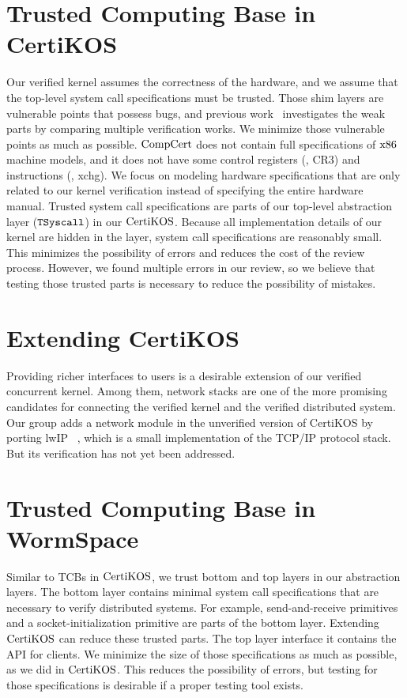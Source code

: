 \section{Trusted Computing Base in CertiKOS}

Our verified kernel assumes the correctness of the hardware, and we assume that the top-level system call specifications must be trusted. 
Those shim layers are vulnerable points that possess bugs, and previous work~\cite{shimlayer} investigates the weak parts by comparing multiple verification works. We minimize those vulnerable points as much as possible. 
$\mathrm{CompCert}$  does not contain full specifications of $\mathrm{x86}$ machine models, 
and it does not have some control registers (\eg, CR3) and instructions (\eg, xchg). 
We focus on modeling hardware specifications that are only related to our kernel verification instead of specifying the entire hardware manual. 
Trusted system call specifications are parts of our top-level abstraction layer (${{\mathrm{\texttt{TSyscall}}}}$) in our $\mathrm{CertiKOS}$. 
Because all implementation details of our kernel are hidden in the layer, system call specifications are reasonably small. 
This minimizes the possibility of errors and reduces the cost of the review process. 
However, we found multiple errors in our review, so we believe that testing those trusted parts is necessary to reduce the possibility of mistakes. 

\section{Extending CertiKOS}

Providing richer interfaces to users is a desirable extension of our verified concurrent kernel. Among them, network stacks are 
one of the more promising candidates for connecting the verified kernel and the verified distributed system. 
Our group adds a network module in the unverified 
version of CertiKOS by porting lwIP ~\cite{lwip},  which is a small implementation of the TCP/IP protocol stack. 
But its verification has not yet been addressed.

\section{Trusted Computing Base in WormSpace}

Similar to TCBs in $\mathrm{CertiKOS}$, we trust bottom and top layers in our abstraction layers.
 The bottom layer contains minimal system call specifications that are necessary to verify distributed systems. 
 For example, send-and-receive primitives and a socket-initialization primitive are parts of the bottom layer. 
Extending $\mathrm{CertiKOS}$ can reduce these trusted parts. 
The top layer interface it contains the API for clients. 
We minimize the size of those specifications as much as possible, as we did in $\mathrm{CertiKOS}$. 
This reduces the possibility of errors, but testing for those specifications is desirable if a proper testing tool exists. 


